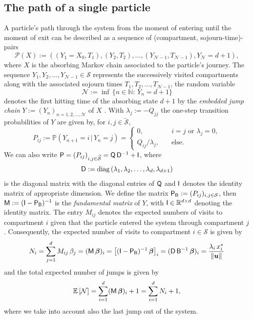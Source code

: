 \documentclass[smallextended]{svjour3}
\newcommand{\R}{\mathbb{R}}
\newcommand{\N}{\mathbb{N}}
\renewcommand{\P}{\mathbb{P}}
\newcommand{\E}{\mathbb{E}}
\newcommand{\suml}{\sum\limits}
\newcommand{\vnorms}[1]{\|#1\|}
\newcommand{\diag}{\operatorname{diag}}
\begin{document}
\subsection{The path of a single particle}
A particle's path through the system from the moment of entering until the moment of exit can be described as a sequence of (compartment, sojourn-time)-pairs
\begin{equation}
  \label{eqn:path}
  \mathcal{P}(X) := ((Y_1=X_0, T_1),(Y_2,T_2),\ldots,(Y_{\mathcal{N}-1},T_{\mathcal{N}-1}), Y_{\mathcal{N}}=d+1),
\end{equation}
where $X$ is the absorbing Markov chain associated to the particle's journey.
The sequence $Y_1,Y_2,\ldots,Y_{\mathcal{N}-1}\in\mathcal{S}$ represents the successively visited compartments along with the associated sojourn times $T_1,T_2,\ldots,T_{\mathcal{N}-1}$, the random variable
\begin{equation*}
  \mathcal{N}:=\inf\,\{n\in\N:\,Y_n=d+1\}
\end{equation*}
denotes the first hitting time of the absorbing state $d+1$ by the \emph{embedded jump chain} $Y:=(Y_n)_{n=1,2,\ldots,\mathcal{N}}$ of $X$ \citep{Norris1997}.
With $\lambda_j:=-Q_{jj}$ the one-step transition probabilities of $Y$ are given by, for $i,j\in\widetilde{\mathcal{S}}$,
\begin{equation}\label{eqn:P_ij}
  P_{ij}:=\P(Y_{n+1}=i\,|\,Y_n=j) = 
  \begin{cases}
    0,\quad & i=j\text{ or }\lambda_j=0,\\
    Q_{ij}/\lambda_j,\quad & \text{else}.
  \end{cases}
\end{equation}
We can also write $\mathsf{P}=(P_{ij})_{i,j\in\widetilde{\mathcal{S}}}=\mathsf{Q}\,\mathsf{D}^{-1} + \mathsf{I}$, where
\begin{equation*}
  \tens{D} := \diag\,(\lambda_1,\lambda_2,\ldots,\lambda_d,\lambda_{d+1})
\end{equation*}
is the diagonal matrix with the diagonal entries of $\mathsf{Q}$ and $\mathsf{I}$ denotes the identity matrix of appropriate dimension.
We define the matrix $\mathsf{P}_{\mathsf{B}} := (P_{ij})_{i,j\in\mathcal{S}}$, then $\mathsf{M}:=(\mathsf{I}-\mathsf{P}_{\mathsf{B}})^{-1}$ is the \emph{fundamental matrix} of $Y$, with $\tens{I}\in\R^{d\times d}$ denoting the identity matrix.
The entry $M_{ij}$ denotes the expected numbers of visits to compartment $i$ given that the particle entered the system through compartment $j$.
Consequently, the expected number of visits to compartment $i\in\mathcal{S}$ is given by 
\begin{equation}
  \label{eqn:N_i}
  N_i = \suml_{j=1}^d M_{ij}\,\beta_j = (\tens{M}\,\vec{\beta})_i = \left[(\tens{I}-\tens{P}_{\tens{B}})^{-1}\,\vec{\beta}\right]_i 
  = (\tens{D}\,\tens{B}^{-1}\,\vec{\beta})_i
  = \frac{\lambda_i\,x^\ast_i}{\vnorms{\vec{u}}}
\end{equation}
and the total expected number of jumps is given by
\begin{equation*}
  \E\left[\mathcal{N}\right] = \suml_{i=1}^d (\tens{M}\,\vec{\beta})_i+1= \suml_{i=1}^d N_i+1,
\end{equation*}
where we take into account also the last jump out of the system.
\end{document}

